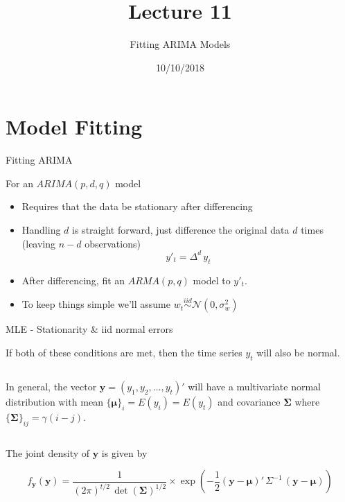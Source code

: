 \documentclass[11pt,ignorenonframetext,]{beamer}
\title{Lecture 11}
\subtitle{Fitting ARIMA Models}
\date{10/10/2018}
\begin{document}
\frame{\titlepage}

\hypertarget{model-fitting}{%
\section{Model Fitting}\label{model-fitting}}

\begin{frame}[t]{Fitting ARIMA}
\protect\hypertarget{fitting-arima}{}

For an \(ARIMA(p,d,q)\) model

\begin{itemize}
\item
  Requires that the data be stationary after differencing \vspace{3mm}
\item
  Handling \(d\) is straight forward, just difference the original data
  \(d\) times (leaving \(n-d\) observations)
  \[ y'_t = \Delta^d \, y_t \] \vspace{3mm}
\item
  After differencing, fit an \(ARMA(p,q)\) model to \(y'_t\).
  \vspace{3mm}
\item
  To keep things simple we'll assume
  \(w_t \overset{iid}{\sim} \mathcal{N}(0,\sigma^2_w)\)
\end{itemize}

\end{frame}

\begin{frame}{MLE - Stationarity \& iid normal errors}
\protect\hypertarget{mle---stationarity-iid-normal-errors}{}

If both of these conditions are met, then the time series \(y_t\) will
also be normal.

\pause

\(~\)

In general, the vector \(\symbf{y} = (y_1, y_2, \ldots, y_t)'\) will
have a multivariate normal distribution with mean
\(\{\symbf\mu\}_i = E(y_i) = E(y_t)\) and covariance \(\symbf\Sigma\)
where \(\{\symbf{\Sigma}\}_{ij} = \gamma(i-j)\).

\(~\)

The joint density of \(\symbf y\) is given by

\[ f_{\symbf y}(\symbf y) = \frac{1}{(2\pi)^{t/2}\,\det(\symbf\Sigma)^{1/2}} \times \exp\left( -\frac{1}{2}(\symbf y - \symbf \mu)' \, \Sigma^{-1} \, (\symbf y - \symbf \mu) \right) \]

\end{frame}
\end{document}
